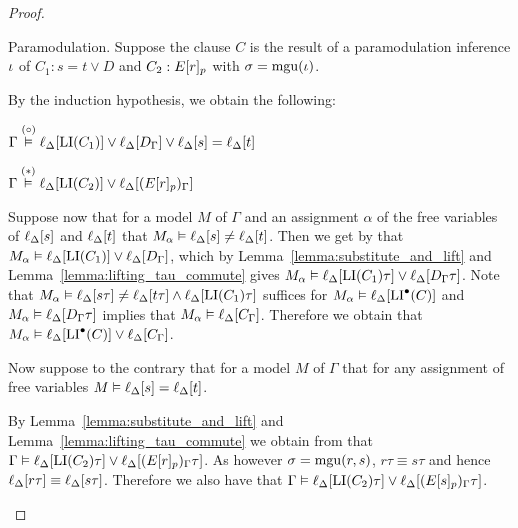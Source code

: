 \begin{proof}
\begin{description}
		\item{} Paramodulation.
			Suppose the clause $C$ is the result of a paramodulation inference\nolinebreak{} $\iota$ of $C_1: s=t \lor D$ and $C_2: E{[r]_{p}}$ with $\sigma=\operatorname{mgu}(\iota)$.

			By the induction hypothesis, we obtain the following: 

			$\Gamma \stackrel{(\circ)}{\vDash} \ell_{\Delta}[\operatorname{LI}(C_1)] \lor \ell_{\Delta}[D_\Gamma] \lor \ell_{\Delta}[s]=\ell_{\Delta}[t]$

			$\Gamma \stackrel{(*)}{\vDash} \ell_{\Delta}[\operatorname{LI}(C_2)] \lor \ell_{\Delta}[(E{[r]_{p}})_\Gamma]$

			Suppose now that for a model $M$ of $\Gamma$ and an assignment $\alpha$ of the free variables of $\ell_{\Delta}[s]$ and $\ell_{\Delta}[t]$ that $M_\alpha \vDash \ell_{\Delta}[s]\neq \ell_{\Delta}[t]$.
			Then we get by \markA{} that $M_\alpha \vDash \ell_{\Delta}[\operatorname{LI}(C_1)] \lor \ell_{\Delta}[D_\Gamma]$, which by Lemma~\ref{lemma:substitute_and_lift} and Lemma~\ref{lemma:lifting_tau_commute} gives $M_\alpha \vDash \ell_{\Delta}[\operatorname{LI}(C_1)\tau] \lor \ell_{\Delta}[D_\Gamma\tau]$.
			Note that $M_\alpha \vDash \ell_{\Delta}[s\tau]\neq \ell_{\Delta}[t\tau] \land \ell_{\Delta}[\operatorname{LI}(C_1)\tau]$ suffices for $M_\alpha \vDash \ell_{\Delta}[\operatorname{LI}^\bullet(C)]$ and $M_\alpha \vDash \ell_{\Delta}[D_\Gamma\tau]$ implies that $M_\alpha \vDash \ell_{\Delta}[C_\Gamma]$.
			Therefore we obtain that 
			$M_\alpha \vDash \ell_{\Delta}[\operatorname{LI}^\bullet(C)] \lor \ell_{\Delta}[C_\Gamma]$.

			Now suppose to the contrary that for a model $M$ of $\Gamma$ that for any assignment of free variables $M \entails \lifdeltanovar{s}\nolinebreak=\lifdeltanovar{t}$.

			By Lemma~\ref{lemma:substitute_and_lift} and  Lemma~\ref{lemma:lifting_tau_commute} we obtain from \markB{} that
			$\Gamma \vDash \ell_{\Delta}[\operatorname{LI}(C_2)\tau] \lor \ell_{\Delta}[(E{[r]_{p}})_\Gamma\tau]$.
			As however $\sigma = \operatorname{mgu}(r, s)$, $r\tau \equiv s\tau$
			and hence $\ell_{\Delta}[r\tau] \equiv \ell_{\Delta}[s\tau]$.
			Therefore we also have that 
			$\Gamma \vDash \ell_{\Delta}[\operatorname{LI}(C_2)\tau] \lor \ell_{\Delta}[(E{[s]_{p}})_\Gamma\tau]$.


\end{description}
\end{proof}
